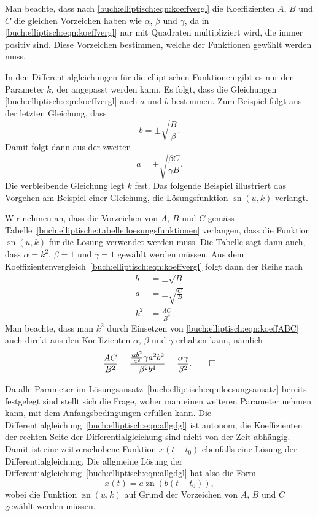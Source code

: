 Man beachte, dass nach \eqref{buch:elliptisch:eqn:koeffvergl} die 
Koeffizienten $A$, $B$ und $C$ die gleichen Vorzeichen haben wie
$\alpha$, $\beta$ und $\gamma$, da in 
\eqref{buch:elliptisch:eqn:koeffvergl} nur mit Quadraten multipliziert
wird, die immer positiv sind.
Diese Vorzeichen bestimmen, welche der Funktionen gewählt werden muss.

In den Differentialgleichungen für die elliptischen Funktionen gibt
es nur den Parameter $k$, der angepasst werden kann.
Es folgt, dass die Gleichungen
\eqref{buch:elliptisch:eqn:koeffvergl} 
auch $a$ und $b$ bestimmen.
Zum Beispiel folgt aus der letzten Gleichung, dass
\[
b = \pm\sqrt{\frac{B}{\beta}}.
\]
Damit folgt dann aus der zweiten
\[
a=\pm\sqrt{\frac{\beta C}{\gamma B}}.
\]
Die verbleibende Gleichung legt $k$ fest.
Das folgende Beispiel illustriert das Vorgehen am Beispiel einer
Gleichung, die Lösungsfunktion $\operatorname{sn}(u,k)$ verlangt.

\begin{beispiel}
Wir nehmen an, dass die Vorzeichen von $A$, $B$ und $C$ gemäss
Tabelle~\ref{buch:elliptische:tabelle:loesungsfunktionen} verlangen,
dass die Funktion $\operatorname{sn}(u,k)$ für die Lösung verwendet
werden muss.
Die Tabelle sagt dann auch, dass 
$\alpha=k^2$, $\beta=1$ und $\gamma=1$ gewählt werden müssen.
Aus dem Koeffizientenvergleich~\eqref{buch:elliptisch:eqn:koeffvergl}
folgt dann der Reihe nach
\begin{align*}
b&=\pm \sqrt{B}
\\
a&=\pm \sqrt{\frac{C}{B}}
\\
k^2
&=
\frac{AC}{B^2}.
\end{align*}
Man beachte, dass man $k^2$ durch Einsetzen von
\eqref{buch:elliptisch:eqn:koeffABC}
auch direkt aus den Koeffizienten $\alpha$, $\beta$ und $\gamma$
erhalten kann, nämlich
\[
\frac{AC}{B^2}
=
\frac{\frac{\alpha b^2}{a^2} \gamma a^2b^2}{\beta^2 b^4}
=
\frac{\alpha\gamma}{\beta^2}.
\qedhere
\]
\end{beispiel}

Da alle Parameter im 
Lösungsansatz~\eqref{buch:elliptisch:eqn:loesungsansatz} bereits
festgelegt sind stellt sich die Frage, woher man einen weiteren
Parameter nehmen kann, mit dem Anfangsbedingungen erfüllen kann.
Die Differentialgleichung~\eqref{buch:elliptisch:eqn:allgdgl} ist
autonom, die Koeffizienten der rechten Seite der Differentialgleichung
sind nicht von der Zeit abhängig. 
Damit ist eine zeitverschobene Funktion $x(t-t_0)$ ebenfalls eine
Lösung der Differentialgleichung.
Die allgmeine Lösung der 
Differentialgleichung~\eqref{buch:elliptisch:eqn:allgdgl} hat
also die Form
\[
x(t) = a\operatorname{zn}(b(t-t_0)),
\]
wobei die Funktion $\operatorname{zn}(u,k)$ auf Grund der Vorzeichen
von $A$, $B$ und $C$ gewählt werden müssen.

